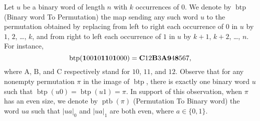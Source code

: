\documentclass[a4paper]{llncs}
\DeclareMathOperator{\BINTOPERM}{\mathrm{btp}}
\DeclareMathOperator{\PERMTOBIN}{\mathrm{ptb}}
\begin{document}
Let $u$ be a binary word of length $n$ with $k$ occurrences of $0$.
We denote by $\BINTOPERM$ (Binary word To Permutation) the map sending
any such word $u$ to the permutation obtained by replacing from left to
right each occurrence of $0$ in $u$ by $1$, $2$, \dots, $k$, and from
right to left each occurrence of $1$ in $u$ by $k + 1$, $k + 2$, \dots, $n$.
For instance,
\begin{equation}
    \BINTOPERM({\bf 1}00{\bf 1}0{\bf 1}{\bf 1}0{\bf 1}000) =
    {\bf C} 12 {\bf B} 3 {\bf A} {\bf 9} 4 {\bf 8} 567,
\end{equation}
where $\mathrm{A}$, $\mathrm{B}$, and $\mathrm{C}$ respectively stand
for $10$, $11$, and $12$. Observe that for any nonempty permutation
$\pi$ in the image of $\BINTOPERM$, there is exactly one binary word $u$
such that $\BINTOPERM(u0) = \BINTOPERM(u1) = \pi$. In support of this
observation, when $\pi$ has an even size, we denote by $\PERMTOBIN(\pi)$
(Permutation To Binary word) the word $ua$ such that $|ua|_0$ and $|ua|_1$
are both even, where $a \in \{0, 1\}$.
\end{document}
